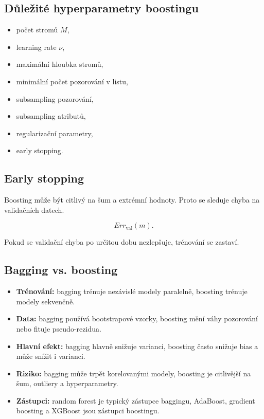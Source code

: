 \subsection{Důležité hyperparametry boostingu}

\begin{itemize}
    \item počet stromů $M$,
    \item learning rate $\nu$,
    \item maximální hloubka stromů,
    \item minimální počet pozorování v listu,
    \item subsampling pozorování,
    \item subsampling atributů,
    \item regularizační parametry,
    \item early stopping.
\end{itemize}

\subsection{Early stopping}

Boosting může být citlivý na šum a extrémní hodnoty. Proto se sleduje chyba na validačních datech.

\[
Err_{\text{val}}(m).
\]

Pokud se validační chyba po určitou dobu nezlepšuje, trénování se zastaví.

\subsection{Bagging vs. boosting}

\begin{itemize}
    \item \textbf{Trénování:}
    bagging trénuje nezávislé modely paralelně, boosting trénuje modely sekvenčně.
    
    \item \textbf{Data:}
    bagging používá bootstrapové vzorky, boosting mění váhy pozorování nebo fituje pseudo-rezidua.
    
    \item \textbf{Hlavní efekt:}
    bagging hlavně snižuje varianci, boosting často snižuje bias a může snížit i varianci.
    
    \item \textbf{Riziko:}
    bagging může trpět korelovanými modely, boosting je citlivější na šum, outliery a hyperparametry.
    
    \item \textbf{Zástupci:}
    random forest je typický zástupce baggingu, AdaBoost, gradient boosting a XGBoost jsou zástupci boostingu.
\end{itemize}

